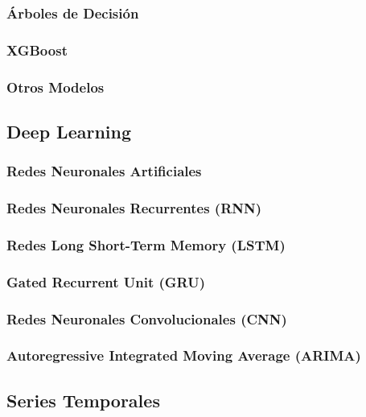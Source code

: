 \documentclass[a4paper,12pt]{article}
\begin{document}
\subsubsection{Árboles de Decisión}

\subsubsection{XGBoost}

\subsubsection{Otros Modelos}

\subsection{Deep Learning}

\subsubsection{Redes Neuronales Artificiales}

\subsubsection{Redes Neuronales Recurrentes (RNN)}

\subsubsection{Redes Long Short-Term Memory (LSTM)}

\subsubsection{Gated Recurrent Unit (GRU)}

\subsubsection{Redes Neuronales Convolucionales (CNN)}

\subsubsection{Autoregressive Integrated Moving Average (ARIMA)}

\subsection{Series Temporales}
\end{document}
